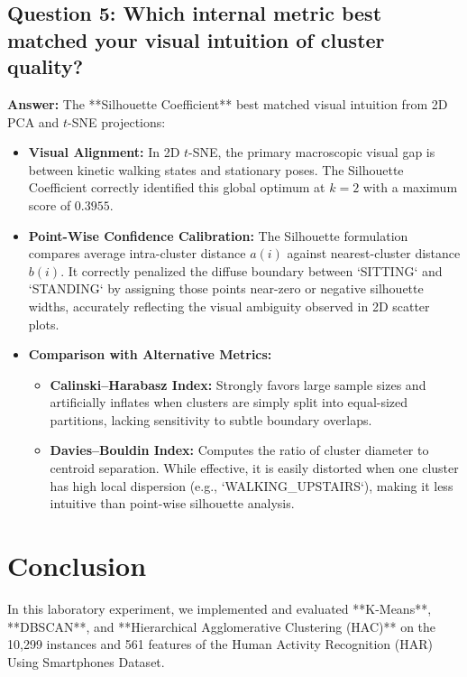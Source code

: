 \documentclass[12pt,a4paper]{article}
\begin{document}
\subsection{Question 5: Which internal metric best matched your visual intuition of cluster quality?}
\textbf{Answer:}
The **Silhouette Coefficient** best matched visual intuition from 2D PCA and $t$-SNE projections:
\begin{itemize}[noitemsep]
    \item \textbf{Visual Alignment:} In 2D $t$-SNE, the primary macroscopic visual gap is between kinetic walking states and stationary poses. The Silhouette Coefficient correctly identified this global optimum at $k=2$ with a maximum score of $0.3955$.
    \item \textbf{Point-Wise Confidence Calibration:} The Silhouette formulation compares average intra-cluster distance $a(i)$ against nearest-cluster distance $b(i)$. It correctly penalized the diffuse boundary between `SITTING` and `STANDING` by assigning those points near-zero or negative silhouette widths, accurately reflecting the visual ambiguity observed in 2D scatter plots.
    \item \textbf{Comparison with Alternative Metrics:}
    \begin{itemize}[noitemsep]
        \item \textbf{Calinski--Harabasz Index:} Strongly favors large sample sizes and artificially inflates when clusters are simply split into equal-sized partitions, lacking sensitivity to subtle boundary overlaps.
        \item \textbf{Davies--Bouldin Index:} Computes the ratio of cluster diameter to centroid separation. While effective, it is easily distorted when one cluster has high local dispersion (e.g., `WALKING\_UPSTAIRS`), making it less intuitive than point-wise silhouette analysis.
    \end{itemize}
\end{itemize}

\section{Conclusion}
In this laboratory experiment, we implemented and evaluated **K-Means**, **DBSCAN**, and **Hierarchical Agglomerative Clustering (HAC)** on the 10,299 instances and 561 features of the Human Activity Recognition (HAR) Using Smartphones Dataset.
\end{document}
